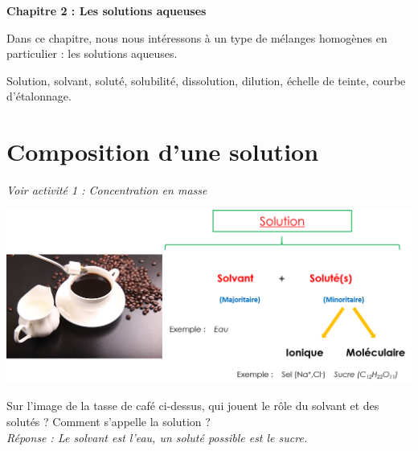 \renewcommand{\thesubsection}{\textcolor{red}{\Roman{section}.\arabic{subsection}}}
\renewcommand{\thesubsubsection}{\textcolor{red}{\Roman{section}.\arabic{subsection}.\alph{subsubsection}}}

\setcounter{section}{0}
\sndEnTeteCoursDeux

\begin{mdframed}[style=titr, leftmargin=60pt, rightmargin=60pt, innertopmargin=7pt, innerbottommargin=7pt, innerrightmargin=8pt, innerleftmargin=8pt]

\begin{center}
\large{\textbf{Chapitre 2 : Les solutions aqueuses}}
\end{center}
\end{mdframed}
Dans ce chapitre, nous nous intéressons à un type de mélanges homogènes en particulier : les solutions aqueuses. 

\begin{tcolorbox}[colback=blue!5!white,colframe=blue!75!black,title=Mots clés du chapitre :]
Solution, solvant, soluté, solubilité, dissolution, dilution, échelle de teinte, courbe d'étalonnage. 
\end{tcolorbox}


\section{Composition d'une solution}
\begin{Large}
\end{Large}\textit{Voir activité 1 : Concentration en masse}
\begin{tcolorbox}[colback=green!5!white,colframe=green!75!black,title=\textbf{Solution, solvant, soluté}]
\begin{center}
    \includegraphics[width=\textwidth]{Images/Solution_def_corr.png}
\end{center}
\end{tcolorbox}
Sur l'image de la tasse de café ci-dessus, qui jouent le rôle du solvant et des solutés ? Comment s'appelle la solution ?\\
\textit{Réponse : Le solvant est l'eau, un soluté possible est le sucre.}

